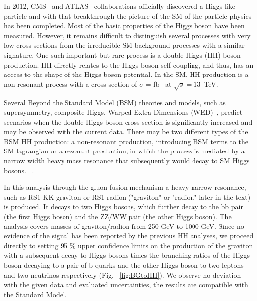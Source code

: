 In 2012, CMS~\cite{HiggsCMS} and
ATLAS~\cite{HiggsAtlas} collaborations officially discovered a Higgs-like particle and with that breakthrough the picture of the
SM \cite{Salam:1961en,Glashow:1961tr,Weinberg:1967tq}
of the particle physics has been completed. 
Most of the basic properties of the Higgs
boson have been measured. 
However, it remains difficult to distinguish several processes with very low
cross sections from the
irreducible SM background processes with a similar signature. 
One such important but rare process is a double Higgs (HH) boson
production. HH directly relates to the Higgs boson self-coupling, and thus,  
has an access to the shape of the Higgs boson potential. In the SM, HH
production is a non-resonant process with a cross section of $\sigma$
=  fb~\cite{HHXsec} at $\sqrt{s}=13$~TeV. 

Several Beyond the Standard
Model (BSM) theories and models, such as supersymmetry, composite Higgs, Warped Extra Dimensions (WED)~\cite{Dolan:2012ac, Huang:2017nnw, Kanemura:2016tan, Oliveira:2014kla, WED}, predict scenarios when the double Higgs boson
cross section is significantly increased and may be observed with the current data.
There may be two different types of the BSM HH production: a non-resonant production,
introducing BSM terms to the SM lagrangian or a resonant production,
in which the process is mediated by a narrow width heavy mass resonance that subsequently would decay to SM Higgs bosons. 
~\cite{WED}. %
\vspace{1em} %


In this analysis through the gluon fusion mechanism a heavy narrow
resonance, such as RS1 KK graviton or RS1 radion ("graviton" or "radion" later in the text) \cite{BG1,BG2,BG3} is produced. It decays to two Higgs bosons, which further decay to the bb pair (the first Higgs boson) and the ZZ/WW pair (the other Higgs boson). 
The analysis covers masses of graviton/radion from 250 GeV to 1000 GeV. Since no evidence of the signal has been reported by the previous HH analyses, we proceed directly to setting 95 \% upper confidence
limits on the production of the graviton with a subsequent
decay to Higgs bosons times the branching ratios of the Higgs
boson decaying to a pair of b quarks and the other Higgs boson to two
leptons and two neutrinos respectively (Fig. ~\ref{fig:BGtoHH}). We observe no deviation with the given data and
evaluated uncertainties, the results are compatible with the Standard
Model.



